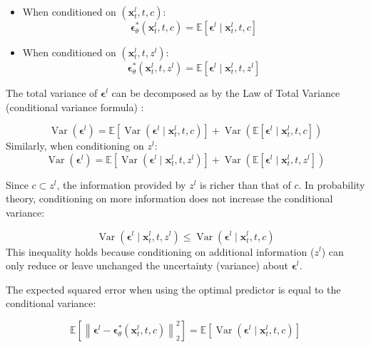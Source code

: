 \begin{itemize}
\item When conditioned on $ (\mathbf{x}_t^l, t, c) $:
$$
\boldsymbol{\epsilon}_\theta^\ast(\mathbf{x}_t^l, t, c) = \mathbb{E}\left[ \boldsymbol{\epsilon}^l \mid \mathbf{x}_t^l, t, c \right]
$$
\item When conditioned on $ (\mathbf{x}_t^l, t, z^l) $:
$$
\boldsymbol{\epsilon}_\theta^\ast(\mathbf{x}_t^l, t, z^l) = \mathbb{E}\left[ \boldsymbol{\epsilon}^l \mid \mathbf{x}_t^l, t, z^l \right]
$$
\end{itemize}
The total variance of $ \boldsymbol{\epsilon}^l $ can be decomposed as by the Law of Total Variance (conditional variance formula) \citep{ross2014introduction}:

$$
\operatorname{Var}\left( \boldsymbol{\epsilon}^l \right) = \mathbb{E}\left[ \operatorname{Var}\left( \boldsymbol{\epsilon}^l \mid \mathbf{x}_t^l, t, c \right) \right] + \operatorname{Var}\left( \mathbb{E}\left[ \boldsymbol{\epsilon}^l \mid \mathbf{x}_t^l, t, c \right] \right)
$$
Similarly, when conditioning on $ z^l $:
$$
\operatorname{Var}\left( \boldsymbol{\epsilon}^l \right) = \mathbb{E}\left[ \operatorname{Var}\left( \boldsymbol{\epsilon}^l \mid \mathbf{x}_t^l, t, z^l \right) \right] + \operatorname{Var}\left( \mathbb{E}\left[ \boldsymbol{\epsilon}^l \mid \mathbf{x}_t^l, t, z^l \right] \right)
$$

Since $ c \subset z^l $, the information provided by $ z^l $ is richer than that of $ c $. In probability theory, conditioning on more information does not increase the conditional variance:

\begin{equation}
\label{equ:appendix_2}
\operatorname{Var}\left( \boldsymbol{\epsilon}^l \mid \mathbf{x}_t^l, t, z^l \right) \leq \operatorname{Var}\left( \boldsymbol{\epsilon}^l \mid \mathbf{x}_t^l, t, c \right)
\end{equation}
This inequality holds because conditioning on additional information ($ z^l $) can only reduce or leave unchanged the uncertainty (variance) about $ \boldsymbol{\epsilon}^l $.


The expected squared error when using the optimal predictor is equal to the conditional variance:

$$
\mathbb{E}\left[ \left\| \boldsymbol{\epsilon}^l - \boldsymbol{\epsilon}_\theta^\ast(\mathbf{x}_t^l, t, c) \right\|_2^2 \right] = \mathbb{E}\left[ \operatorname{Var}\left( \boldsymbol{\epsilon}^l \mid \mathbf{x}_t^l, t, c \right) \right]
$$

